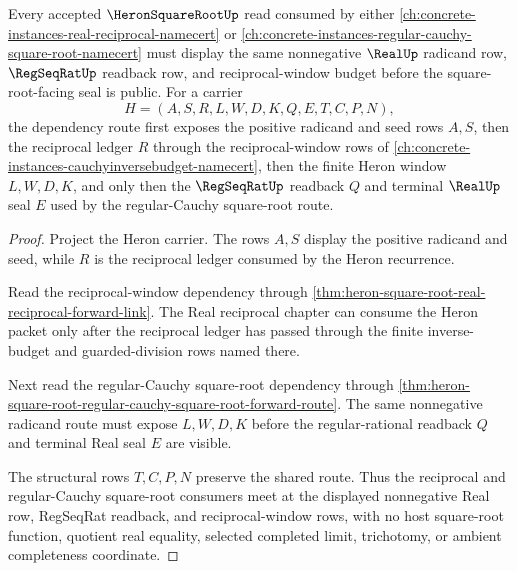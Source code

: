 \begin{theorem}
\label{thm:heron-square-root-nonnegative-regular-cauchy-reciprocal-window-route}
Every accepted $\HeronSquareRootUp$ read consumed by either \autoref{ch:concrete-instances-real-reciprocal-namecert} or \autoref{ch:concrete-instances-regular-cauchy-square-root-namecert} must display the same nonnegative $\RealUp$ radicand row, $\RegSeqRatUp$ readback row, and reciprocal-window budget before the square-root-facing seal is public. For a carrier
$$
H=(A,S,R,L,W,D,K,Q,E,T,C,P,N),
$$
the dependency route first exposes the positive radicand and seed rows $A,S$, then the reciprocal ledger $R$ through the reciprocal-window rows of \autoref{ch:concrete-instances-cauchyinversebudget-namecert}, then the finite Heron window $L,W,D,K$, and only then the $\RegSeqRatUp$ readback $Q$ and terminal $\RealUp$ seal $E$ used by the regular-Cauchy square-root route.
\end{theorem}
\begin{proof}
Project the Heron carrier. The rows $A,S$ display the positive radicand and seed, while $R$ is the reciprocal ledger consumed by the Heron recurrence.

Read the reciprocal-window dependency through \autoref{thm:heron-square-root-real-reciprocal-forward-link}. The Real reciprocal chapter can consume the Heron packet only after the reciprocal ledger has passed through the finite inverse-budget and guarded-division rows named there.

Next read the regular-Cauchy square-root dependency through \autoref{thm:heron-square-root-regular-cauchy-square-root-forward-route}. The same nonnegative radicand route must expose $L,W,D,K$ before the regular-rational readback $Q$ and terminal Real seal $E$ are visible.

The structural rows $T,C,P,N$ preserve the shared route. Thus the reciprocal and regular-Cauchy square-root consumers meet at the displayed nonnegative Real row, RegSeqRat readback, and reciprocal-window rows, with no host square-root function, quotient real equality, selected completed limit, trichotomy, or ambient completeness coordinate.
\end{proof}
